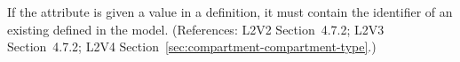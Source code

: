 If the  attribute is given a
value in a \Compartment definition, it must contain the identifier
of an existing \CompartmentType defined in the model.
(References: L2V2 Section~4.7.2; L2V3
Section~4.7.2; L2V4 Section~\ref{sec:compartment-compartment-type}.)
